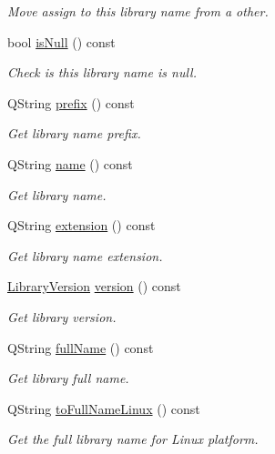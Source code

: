 \begin{DoxyCompactItemize}
\begin{DoxyCompactList}\small\item\em Move assign to this library name from a other. \end{DoxyCompactList}\item 
bool \hyperlink{class_mdt_1_1_deploy_utils_1_1_library_name_ab833694184a4cf330ddf77095ea6bb9f}{is\+Null} () const 
\begin{DoxyCompactList}\small\item\em Check is this library name is null. \end{DoxyCompactList}\item 
Q\+String \hyperlink{class_mdt_1_1_deploy_utils_1_1_library_name_a97bcd2eb9df2f836ade7db5b1812e808}{prefix} () const 
\begin{DoxyCompactList}\small\item\em Get library name prefix. \end{DoxyCompactList}\item 
Q\+String \hyperlink{class_mdt_1_1_deploy_utils_1_1_library_name_a4b379ec428e7819d9f164f25a472b6b1}{name} () const 
\begin{DoxyCompactList}\small\item\em Get library name. \end{DoxyCompactList}\item 
Q\+String \hyperlink{class_mdt_1_1_deploy_utils_1_1_library_name_a34442b11c8cd11ceb8f6903d473dcd2d}{extension} () const 
\begin{DoxyCompactList}\small\item\em Get library name extension. \end{DoxyCompactList}\item 
\hyperlink{class_mdt_1_1_deploy_utils_1_1_library_version}{Library\+Version} \hyperlink{class_mdt_1_1_deploy_utils_1_1_library_name_a59e3df9a9af9a081a9b09eec7292bb80}{version} () const 
\begin{DoxyCompactList}\small\item\em Get library version. \end{DoxyCompactList}\item 
Q\+String \hyperlink{class_mdt_1_1_deploy_utils_1_1_library_name_a2ca0dd90765abc0bd7082bc3f64da1c7}{full\+Name} () const 
\begin{DoxyCompactList}\small\item\em Get library full name. \end{DoxyCompactList}\item 
Q\+String \hyperlink{class_mdt_1_1_deploy_utils_1_1_library_name_a53890f4faa14e43f3b38fb9aabae88c9}{to\+Full\+Name\+Linux} () const 
\begin{DoxyCompactList}\small\item\em Get the full library name for Linux platform. \end{DoxyCompactList}\end{DoxyCompactItemize}

